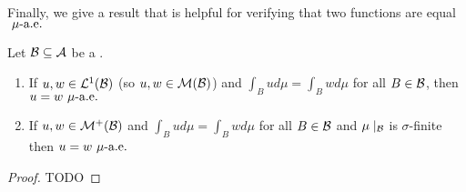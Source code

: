 Finally, we give a result that is helpful for verifying that two functions are equal $\ \mu\text{-a.e. }$

\begin{cor}
	Let $\mathcal{B} \subseteq \mathcal{A}$ be a \siga.
	
	\begin{enumerate}
		\item If $u, w \in \mathcal{L}^1(\mathcal{B})$ (so $u, w \in \mathcal{M}(\mathcal{B})$) and $\int_B u d\mu = \int_B w d\mu$ for all $B \in \mathcal{B}$, then $u = w\ \mu\text{-a.e. }$
		
		\item If $u, w \in \mathcal{M}^+(\mathcal{B})$ and $\int_B u d\mu = \int_B w d\mu$ for all $B \in \mathcal{B}$ and $\mu\mid_{\mathcal{B}}$ is $\sigma$-finite then $u = w \ \mu\text{-a.e. }$
	\end{enumerate}
\end{cor}

\begin{proof}
	TODO
\end{proof}

\begin{remark}
	
\end{remark}